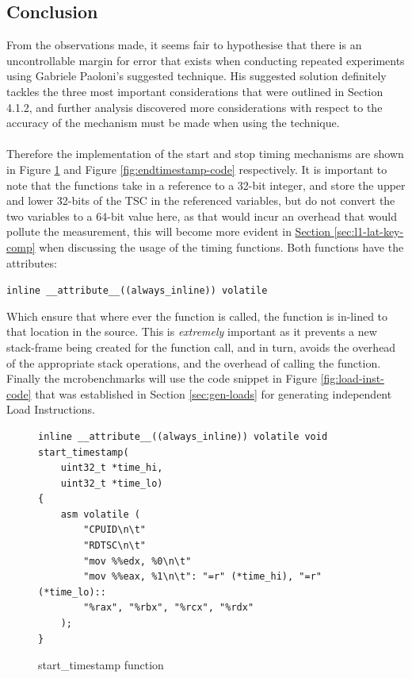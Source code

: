 \documentclass[bsc,frontabs,twoside,singlespacing,parskip,deptreport]{infthesis}     %
\begin{document}

\subsection{Conclusion}
From the observations made, it seems fair to hypothesise that there is an uncontrollable margin for error that exists when conducting repeated experiments using Gabriele Paoloni's suggested technique\cite{code_exec_times}. His suggested solution definitely tackles the three most important considerations that were outlined in Section 4.1.2, and further analysis discovered more considerations with respect to the accuracy of the mechanism must be made when using the technique. \\
\\
Therefore the implementation of the start and stop timing mechanisms are shown in Figure \ref{fig:starttimestamp-code} and Figure \ref{fig:endtimestamp-code} respectively. It is important to note that the functions take in a reference to a 32-bit integer, and store the upper and lower 32-bits of the TSC in the referenced variables, but do not convert the two variables to a 64-bit value here, as that would incur an overhead that would pollute the measurement, this will become more evident in \hyperref[sec:l1-lat-key-comp]{Section \ref{sec:l1-lat-key-comp}} when discussing the usage of the timing functions. Both functions have the attributes:
    
    \begin{center}
        \texttt{inline \_\_attribute\_\_((always\_inline)) volatile}
    \end{center}
Which ensure that where ever the function is called, the function is in-lined to that location in the source. This is \emph{extremely} important as it prevents a new stack-frame being created for the function call, and in turn, avoids the overhead of the appropriate stack operations, and the overhead of calling the function. Finally the mcrobenchmarks will use the code snippet in Figure \ref{fig:load-inst-code} that was established in Section \ref{sec:gen-loads} for generating independent Load Instructions.

\begin{figure}[h!]
    \centering
    \begin{verbatim}
inline __attribute__((always_inline)) volatile void start_timestamp(
    uint32_t *time_hi,
    uint32_t *time_lo)
{
    asm volatile (
        "CPUID\n\t"
        "RDTSC\n\t"
        "mov %%edx, %0\n\t"
        "mov %%eax, %1\n\t": "=r" (*time_hi), "=r" (*time_lo)::
        "%rax", "%rbx", "%rcx", "%rdx"
    );
}
    \end{verbatim}
    \caption{start\_timestamp function}
    \label{fig:starttimestamp-code}
\end{figure}
\end{document}
